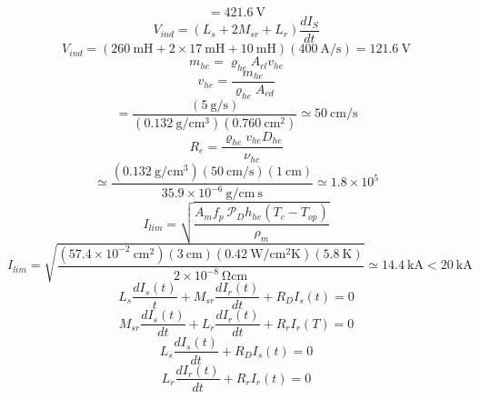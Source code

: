 \begin{equation}%
=421.6\ \mathrm{V}
\end{equation}
\begin{equation}%
V_{ind}=(L_s+2M_{sr}+L_r)\frac{dI_S}{dt}
\end{equation}
\begin{equation}%
V_{ind}=(260\ \mathrm{mH}+2\times17\ \mathrm{mH}+10\ \mathrm{mH})(400\ \mathrm{A/s})=121.6\ \mathrm{V}
\end{equation}
\begin{equation}%
m_{he}=\varrho_{he}A_{cl}v_{he}
\end{equation}
\begin{equation}%
v_{he}=\frac{m_{he}}{\varrho_{he}A_{cd}}
\end{equation}
\begin{equation}%
=\frac{(5\ \mathrm{g/s})}{(0.132\ \mathrm{g/cm^3})(0.760\ \mathrm{cm^2})}\simeq50\ \mathrm{cm/s}
\end{equation}
\begin{equation}%
R_e=\frac{\varrho_{he}v_{he}D_{he}}{\nu_{he}}
\end{equation}
\begin{equation}%
\simeq\frac{(0.132\ \mathrm{g/cm^3})(50\ \mathrm{cm/s})(1\ \mathrm{cm})}{35.9\times10^{-6}\ \mathrm{g/cm\ s}}\simeq1.8\times10^5
\end{equation}
\begin{equation}%
I_{lim}=\sqrt{\frac{A_mf_p\ \mathcal{P}_Dh_{he}(T_c-T_{op})}{\rho_m}}
\end{equation}
\begin{equation}%
I_{lim}=\sqrt{\frac{(57.4\times10^{-2}\ \mathrm{cm^2})(3\ \mathrm{cm})(0.42\ \mathrm{W/cm^2K})(5.8\ \mathrm{K})}{2\times10^{-8}\ \mathrm{\Omega cm}}}\simeq 14.4\ \mathrm{kA}<20\ \mathrm{kA}
\end{equation}
\begin{equation}%
L_s\frac{dI_s(t)}{t}+M_{sr}\frac{dI_r(t)}{dt}+R_DI_s(t)=0
\end{equation}
\begin{equation}%
M_{sr}\frac{dI_s(t)}{dt}+L_r\frac{dI_r(t)}{dt}+R_rI_r(T)=0
\end{equation}
\begin{equation}%
L_s\frac{dI_s(t)}{dt}+R_DI_s(t)=0
\end{equation}
\begin{equation}%
L_r\frac{dI_r(t)}{dt}+R_rI_r(t)=0
\end{equation}
